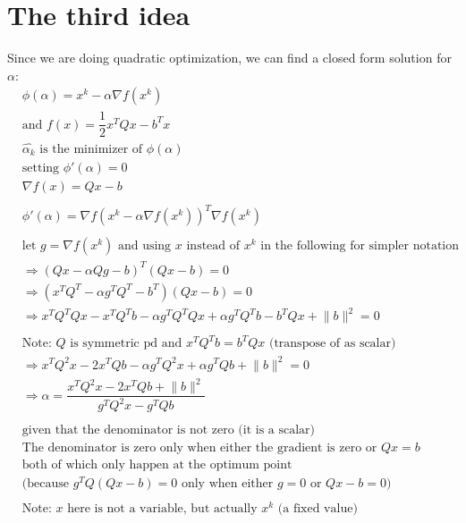 \documentclass[11pt]{article}
\begin{document}
\section{The third idea}
Since we are doing quadratic optimization, we can find a closed form solution for
\(\alpha\):
\begin{align*}
    &\phi(\alpha)= x^k-\alpha\nabla f(x^k)\\
    &\mbox{and }f(x)=\dfrac{1}{2}x^TQx-b^Tx\\
    &\hat{\alpha_k}\mbox{ is the minimizer of }\phi(\alpha)\\
    &\mbox{setting }\phi'(\alpha)=0\\
    &\nabla f(x)=Qx-b\\
    &\\
    &\phi'(\alpha)=\nabla f\left(x^k-\alpha\nabla f(x^k)\right)^T\nabla f(x^k)\\
    &\\
    &\mbox{let $g=\nabla f(x^k)$ and using $x$ instead of $x^k$ in the following for
    simpler notation}\\
    &\Rightarrow \left(Qx-\alpha Qg-b\right)^T(Qx-b)=0\\
    &\Rightarrow \left(x^TQ^T-\alpha g^TQ^T -b^T\right)(Qx-b)=0\\
    &\Rightarrow x^TQ^TQx-x^TQ^Tb-\alpha g^TQ^TQx + \alpha g^TQ^Tb - b^TQx +\lVert b\rVert^2=0\\
    &\\
    &\mbox{Note: $Q$ is symmetric pd and $x^TQ^Tb=b^TQx$ (transpose of as scalar)}\\
    &\Rightarrow x^TQ^2x-2x^TQb-\alpha g^TQ^2x+\alpha g^TQb+\lVert b\rVert^2=0\\
    &\Rightarrow \alpha=\dfrac{x^TQ^2x-2x^TQb+\lVert b\rVert^2}{g^TQ^2x-g^TQb}\\
    &\\
    &\mbox{given that the denominator is not zero (it is a scalar)}\\
    &\mbox{The denominator is zero only when either the gradient is zero or $Qx=b$}\\
    &\mbox{both of which only happen at the optimum point}\\
    &\mbox{(because }g^TQ(Qx-b)=0\mbox{ only when either $g=0$ or $Qx-b=0$)}\\
    &\\
    &\mbox{Note: $x$ here is not a variable, but actually $x^k$ (a fixed value)}
\end{align*}
\end{document}
